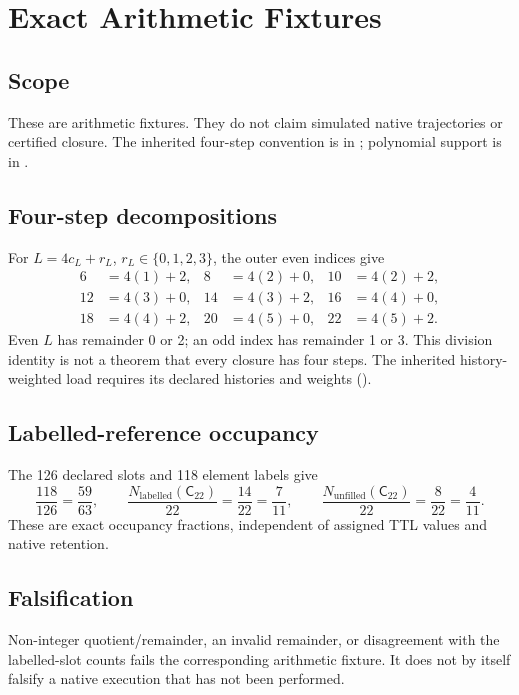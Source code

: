 \section{Exact Arithmetic Fixtures}\label{manual2:app:simulation-fixtures}

\subsection{Scope}\label{manual2:app:sim-scope}
These are arithmetic fixtures. They do not claim simulated native trajectories or certified closure. The inherited four-step convention is in ; polynomial support is in .

\subsection{Four-step decompositions}\label{manual2:app:four-step}
For \(L=4c_L+r_L\), \(r_L\in\{0,1,2,3\}\), the outer even indices give
\[
\begin{aligned}
6&=4(1)+2,&8&=4(2)+0,&10&=4(2)+2,\\
12&=4(3)+0,&14&=4(3)+2,&16&=4(4)+0,\\
18&=4(4)+2,&20&=4(5)+0,&22&=4(5)+2.
\end{aligned}
\]
Even \(L\) has remainder 0 or 2; an odd index has remainder 1 or 3. This division identity is not a theorem that every closure has four steps. The inherited history-weighted load requires its declared histories and weights ().

\subsection{Labelled-reference occupancy}\label{manual2:app:occupancy}
The 126 declared slots and 118 element labels give
\[
\frac{118}{126}=\frac{59}{63},\qquad
\frac{N_{\mathrm{labelled}}(\mathsf C_{22})}{22}=\frac{14}{22}=\frac7{11},
\qquad
\frac{N_{\mathrm{unfilled}}(\mathsf C_{22})}{22}=\frac8{22}=\frac4{11}.
\]
These are exact occupancy fractions, independent of assigned TTL values and native retention.

\subsection{Falsification}\label{manual2:app:sim-falsification}
Non-integer quotient/remainder, an invalid remainder, or disagreement with the labelled-slot counts fails the corresponding arithmetic fixture. It does not by itself falsify a native execution that has not been performed.

